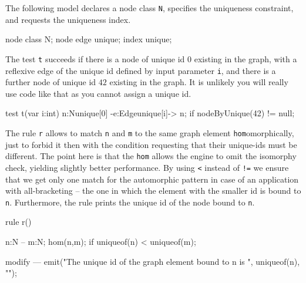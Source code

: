 \begin{example}

The following model declares a node class \texttt{N}, specifies the uniqueness constraint, and requests the uniqueness index.
 
\begin{grgen}
node class N;
node edge unique;
index unique;
\end{grgen}

The test \texttt{t} succeeds if there is a node of unique id $0$ existing in the graph, with a reflexive edge of the unique id defined by input parameter \texttt{i}, and there is a further node of unique id $42$ existing in the graph. It is unlikely you will really use code like that as you cannot assign a unique id.

\begin{grgen}
test t(var i:int) {
  n:N{unique[0]} -e:Edge{unique[i]}-> n;
  if{ nodeByUnique(42) != null; }
}
\end{grgen}

The rule \texttt{r} allows to match \texttt{n} and \texttt{m} to the same graph element \texttt{hom}omorphically, just to forbid it then with the condition requesting that their unique-ids must be different. The point here is that the \texttt{hom} allows the engine to omit the isomorphy check, yielding slightly better performance. By using \verb#<# instead of \verb#!=# we ensure that we get only one match for the automorphic pattern in case of an application with all-bracketing -- the one in which the element with the smaller id is bound to \texttt{n}. Furthermore, the rule prints the unique id of the node bound to \texttt{n}.

\begin{grgen}
rule r() {
  n:N -- m:N;
  hom(n,m);
  if{ uniqueof(n) < uniqueof(m); }
		
  modify {
  ---
    emit("The unique id of the graph element bound to n is ", uniqueof(n), "\n");
  }
}
\end{grgen}

\end{example}


